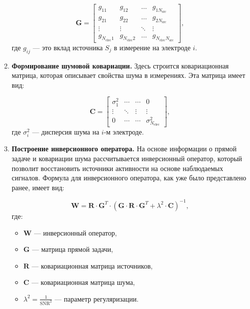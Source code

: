 \begin{enumerate}
    \begin{equation}
    \mathbf{G} = \begin{bmatrix}
    g_{11} & g_{12} & \dots & g_{1N_{\text{src}}} \\
    g_{21} & g_{22} & \dots & g_{2N_{\text{src}}} \\
    \vdots & \vdots & \ddots & \vdots \\
    g_{N_{\text{elec}}1} & g_{N_{\text{elec}}2} & \dots & g_{N_{\text{elec}}N_{\text{src}}}
    \end{bmatrix},
    \end{equation}
    где \(g_{ij}\) — это вклад источника \(S_j\) в измерение на электроде \(i\).

    \item \textbf{Формирование шумовой ковариации.} Здесь строится ковариационная матрица, которая описывает свойства шума в измерениях. Эта матрица имеет вид:

    \begin{equation}
    \mathbf{C} = \begin{bmatrix}
    \sigma_1^2 & \cdots & \cdots & 0 \\
    \vdots & \ddots & \vdots & \vdots \\
    0 & \cdots & \cdots & \sigma_{N_{\text{elec}}}^2
    \end{bmatrix},
    \end{equation}
    где \(\sigma_i^2\) — дисперсия шума на \(i\)-м электроде.

    \item \textbf{Построение инверсионного оператора.} На основе информации о прямой задаче и ковариации шума рассчитывается инверсионный оператор, который позволит восстановить источники активности на основе наблюдаемых сигналов. Формула для инверсионного оператора, как уже было представлено ранее, имеет вид:

    \begin{equation}
    \mathbf{W} = \mathbf{R} \cdot \mathbf{G}^T \cdot \left( \mathbf{G} \cdot \mathbf{R} \cdot \mathbf{G}^T + \lambda^2 \cdot \mathbf{C} \right)^{-1},
    \end{equation}
    где:
    \begin{itemize}
        \item \(\mathbf{W}\) — инверсионный оператор,
        \item \(\mathbf{G}\) — матрица прямой задачи,
        \item \(\mathbf{R}\) — ковариационная матрица источников,
        \item \(\mathbf{C}\) — ковариационная матрица шума,
        \item \(\lambda^2 = \frac{1}{\text{SNR}^2}\) — параметр регуляризации.
    \end{itemize}
\end{enumerate}

